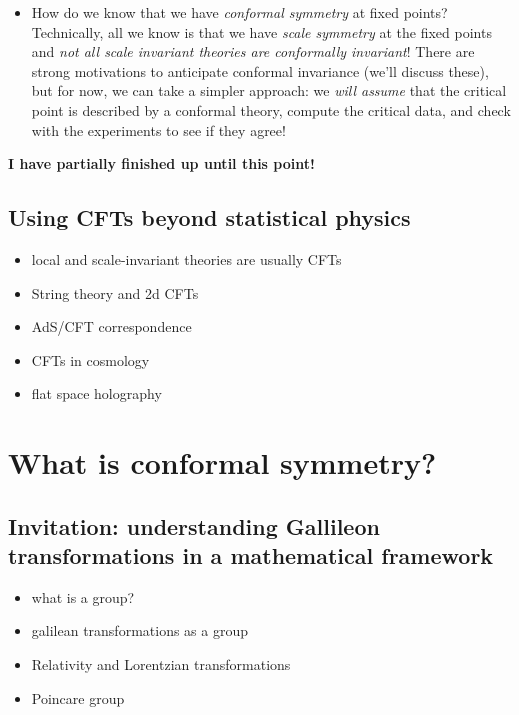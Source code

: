 \documentclass[12pt]{article}
\numberwithin{equation}{section}
\begin{document}
\begin{itemize}
\item How do we know that we have \emph{conformal symmetry} at fixed points? Technically, all we know is that we have \emph{scale symmetry} at the fixed points and \emph{not all scale invariant theories are conformally invariant}! There are strong motivations to anticipate conformal invariance (we'll discuss these), but for now, we can take a simpler approach: we \emph{will assume} that the critical point is described by a conformal theory, compute the critical data, and check with the experiments to see if they agree!

\end{itemize}

\begin{center}
\bfseries\Huge 
I have partially finished up until this point!
\end{center}

\clearpage

\subsection{Using CFTs beyond statistical physics}
\begin{itemize}
	\item local and scale-invariant theories are usually CFTs
	\item String theory and 2d CFTs
	\item AdS/CFT correspondence
	\item CFTs in cosmology
	\item flat space holography
\end{itemize}

\section{What is conformal symmetry?}
\subsection{Invitation: understanding Gallileon transformations in a mathematical framework}
\begin{itemize}
	\item what is a group?
	\item galilean transformations as a group
	\item Relativity and Lorentzian transformations
	\item Poincare group
\end{itemize}
\end{document}
